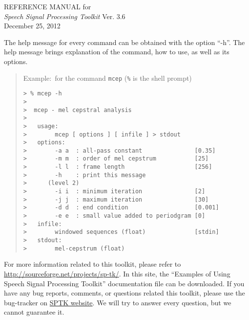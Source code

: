 \documentclass[12pt]{book}
\begin{document}


\begin{titlepage} 
\vspace*{\fill}
 \begin{center}
        \LARGE
        {\rm REFERENCE MANUAL for} \\
        {\sl Speech Signal Processing Toolkit} Ver. 3.6 \\[10mm]
        {\rm December 25, 2012}
 \end{center}
\vspace*{\fill}
\vspace*{\fill}

\newpage
\thispagestyle{empty}
\vspace*{\fill}
\noindent
The help message for every command can be obtained
with the option ``-h''.
The help message brings explanation of the command, how to use, 
as well as its options.

\begin{quote}
 Example:~for the command \verb!mcep! (\verb!%! is the shell prompt)
 \begin{verbatim}
> % mcep -h
> 
>  mcep - mel cepstral analysis
> 
>   usage:
>        mcep [ options ] [ infile ] > stdout
>   options:
>        -a a  : all-pass constant               [0.35]
>        -m m  : order of mel cepstrum           [25]
>        -l l  : frame length                    [256]
>        -h    : print this message
>      (level 2)
>        -i i  : minimum iteration               [2]
>        -j j  : maximum iteration               [30]
>        -d d  : end condition                   [0.001]
>        -e e  : small value added to periodgram [0]
>   infile:
>        windowed sequences (float)              [stdin]
>   stdout:
>        mel-cepstrum (float)
 \end{verbatim}
\end{quote}
\vspace{\baselineskip}
\noindent
For more information related to this toolkit,
please refer to
\href{http://sourceforge.net/projects/sp-tk/}{http://sourceforge.net/projects/sp-tk/}.
In this site, the
``Examples of Using Speech Signal Processing Toolkit''
documentation file can be downloaded.
If you have any bug reports, comments, or questions
related this toolkit, please use the bug-tracker on
\href{http://sourceforge.net/tracker/?group_id=176586}{SPTK website}.
We will try to answer every question, but we cannot guarantee it.
\end{titlepage}

\cleardoublepage
\pagestyle{headings}
\tableofcontents
\end{document}
